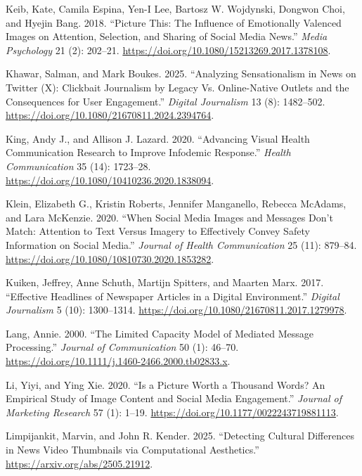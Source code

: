 \documentclass[
  12pt,
]{article}
\newlength{\cslhangindent}
\newenvironment{CSLReferences}[2] %
 {\begin{list}{}{%
  \setlength{\itemindent}{0pt}
  \setlength{\leftmargin}{0pt}
  \setlength{\parsep}{0pt}
  \ifodd #1
   \setlength{\leftmargin}{\cslhangindent}
   \setlength{\itemindent}{-1\cslhangindent}
  \fi
  \setlength{\itemsep}{#2\baselineskip}}}
 {\end{list}}
\begin{document}
\begin{CSLReferences}{1}{0}
Keib, Kate, Camila Espina, Yen-I Lee, Bartosz W. Wojdynski, Dongwon
Choi, and Hyejin Bang. 2018. {``Picture This: The Influence of
Emotionally Valenced Images on Attention, Selection, and Sharing of
Social Media News.''} \emph{Media Psychology} 21 (2): 202--21.
\url{https://doi.org/10.1080/15213269.2017.1378108}.

Khawar, Salman, and Mark Boukes. 2025. {``Analyzing Sensationalism in
News on {Twitter} ({X}): Clickbait Journalism by Legacy Vs.
Online-Native Outlets and the Consequences for User Engagement.''}
\emph{Digital Journalism} 13 (8): 1482--502.
\url{https://doi.org/10.1080/21670811.2024.2394764}.

King, Andy J., and Allison J. Lazard. 2020. {``Advancing Visual Health
Communication Research to Improve Infodemic Response.''} \emph{Health
Communication} 35 (14): 1723--28.
\url{https://doi.org/10.1080/10410236.2020.1838094}.

Klein, Elizabeth G., Kristin Roberts, Jennifer Manganello, Rebecca
McAdams, and Lara McKenzie. 2020. {``When Social Media Images and
Messages Don't Match: Attention to Text Versus Imagery to Effectively
Convey Safety Information on Social Media.''} \emph{Journal of Health
Communication} 25 (11): 879--84.
\url{https://doi.org/10.1080/10810730.2020.1853282}.

Kuiken, Jeffrey, Anne Schuth, Martijn Spitters, and Maarten Marx. 2017.
{``Effective Headlines of Newspaper Articles in a Digital
Environment.''} \emph{Digital Journalism} 5 (10): 1300--1314.
\url{https://doi.org/10.1080/21670811.2017.1279978}.

Lang, Annie. 2000. {``The Limited Capacity Model of Mediated Message
Processing.''} \emph{Journal of Communication} 50 (1): 46--70.
\url{https://doi.org/10.1111/j.1460-2466.2000.tb02833.x}.

Li, Yiyi, and Ying Xie. 2020. {``Is a Picture Worth a Thousand Words?
{A}n Empirical Study of Image Content and Social Media Engagement.''}
\emph{Journal of Marketing Research} 57 (1): 1--19.
\url{https://doi.org/10.1177/0022243719881113}.

Limpijankit, Marvin, and John R. Kender. 2025. {``Detecting Cultural
Differences in News Video Thumbnails via Computational Aesthetics.''}
\url{https://arxiv.org/abs/2505.21912}.


\end{CSLReferences}
\end{document}
